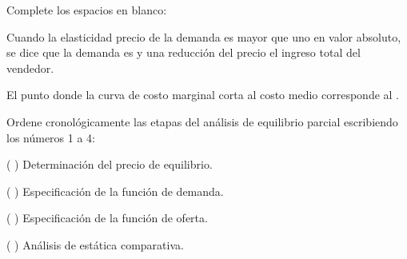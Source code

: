 \documentclass{evaluacion}
\begin{document}
\begin{pregunta}[3]
Complete los espacios en blanco:
\begin{apartados}
  \item Cuando la elasticidad precio de la demanda es mayor que uno en
        valor absoluto, se dice que la demanda es
        \completar[elástica]{3.2cm} y una reducción del precio
        \completar[aumenta]{3.2cm} el ingreso total del vendedor.
  \item El punto donde la curva de costo marginal corta al costo medio
        corresponde al .
\end{apartados}
\end{pregunta}

\begin{pregunta}[3]
Ordene cronológicamente las etapas del análisis de equilibrio parcial
escribiendo los números 1 a 4:
\begin{apartados}
  \item (\,\completar[3]{0.9cm}\,) Determinación del precio de equilibrio.
  \item (\,\completar[1]{0.9cm}\,) Especificación de la función de demanda.
  \item (\,\completar[2]{0.9cm}\,) Especificación de la función de oferta.
  \item (\,\completar[4]{0.9cm}\,) Análisis de estática comparativa.
\end{apartados}
\end{pregunta}

\findelexamen
\end{document}
